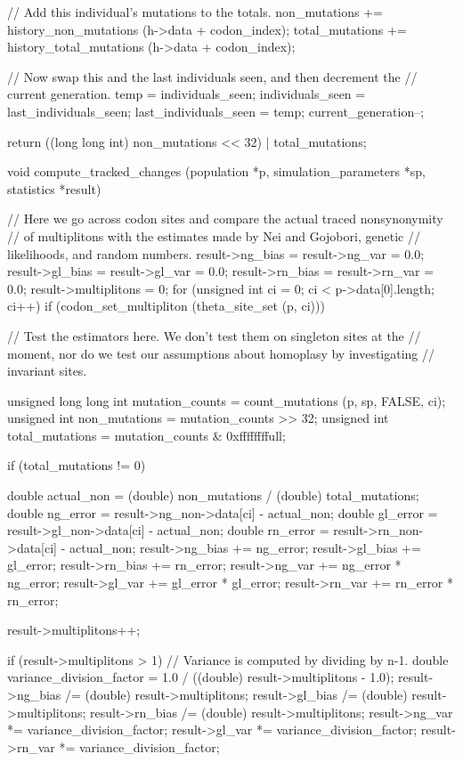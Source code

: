 \documentclass{article}
\begin{document}
\begin{ccode}
{{{        // Add this individual’s mutations to the totals.
        non_mutations += history_non_mutations (h->data + codon_index);
        total_mutations += history_total_mutations (h->data + codon_index);
      }

    // Now swap this and the last individuals seen, and then decrement the
    // current generation.
    temp = individuals_seen;
    individuals_seen = last_individuals_seen;
    last_individuals_seen = temp;
    current_generation--;
  }

  return ((long long int) non_mutations << 32) | total_mutations;
}

void compute_tracked_changes (population *p, simulation_parameters *sp, statistics *result) {
  // Here we go across codon sites and compare the actual traced nonsynonymity
  // of multiplitons with the estimates made by Nei and Gojobori, genetic
  // likelihoods, and random numbers.
  result->ng_bias = result->ng_var = 0.0;
  result->gl_bias = result->gl_var = 0.0;
  result->rn_bias = result->rn_var = 0.0;
  result->multiplitons = 0;
  for (unsigned int ci = 0; ci < p->data[0].length; ci++)
    if (codon_set_multipliton (theta_site_set (p, ci))) {
      // Test the estimators here. We don’t test them on singleton sites at the
      // moment, nor do we test our assumptions about homoplasy by investigating
      // invariant sites.

      unsigned long long int mutation_counts = count_mutations (p, sp, FALSE, ci);
      unsigned int	     non_mutations   = mutation_counts >> 32;
      unsigned int	     total_mutations = mutation_counts & 0xffffffffull;

      if (total_mutations != 0) {
        double actual_non = (double) non_mutations /
			    (double) total_mutations;
        double ng_error = result->ng_non->data[ci] - actual_non;
        double gl_error = result->gl_non->data[ci] - actual_non;
        double rn_error = result->rn_non->data[ci] - actual_non;
        result->ng_bias += ng_error;
        result->gl_bias += gl_error;
        result->rn_bias += rn_error;
        result->ng_var += ng_error * ng_error;
        result->gl_var += gl_error * gl_error;
        result->rn_var += rn_error * rn_error;

        result->multiplitons++;
      }
    }

  if (result->multiplitons > 1) {
    // Variance is computed by dividing by n-1.
    double variance_division_factor = 1.0 / ((double) result->multiplitons - 1.0);
    result->ng_bias /= (double) result->multiplitons;
    result->gl_bias /= (double) result->multiplitons;
    result->rn_bias /= (double) result->multiplitons;
    result->ng_var *= variance_division_factor;
    result->gl_var *= variance_division_factor;
    result->rn_var *= variance_division_factor;
  }
}
\end{ccode}
\end{document}
